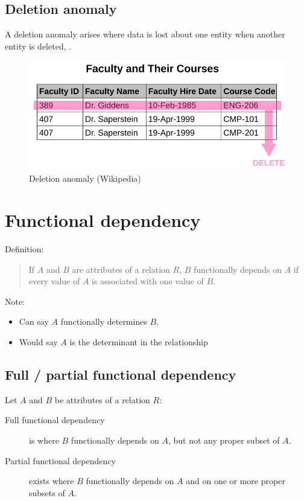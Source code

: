 \documentclass[slides]{pgnotes}
\begin{document}
\subsection{Deletion anomaly}\label{deletion}

A deletion anomaly arises where data is lost about one entity when
another entity is deleted, .

\begin{figure}[htbp]
\centering
\includegraphics[width=0.5\linewidth]{deletion_anomaly}
\caption{Deletion anomaly (Wikipedia){}}
\end{figure}

\newpage

\section{Functional dependency}\label{functional-dependency}

Definition:

\begin{quotation}
If \(A\) and \(B\) are attributes of a relation \(R\), \(B\)
functionally depends on \(A\) if every value of \(A\) is associated with
one value of \(B\).
\end{quotation}

Note: 

\begin{itemize}
\item
  Can say \(A\) functionally determines \(B\).
\item
  Would say \(A\) is the determinant in the relationship
\end{itemize}


\subsection{Full / partial functional dependency}
\label{full-partial-functional-dependency}

Let \(A\) and \(B\) be attributes of a relation \(R\):

\begin{description}
\item[Full functional dependency] is where \(B\) functionally depends on \(A\), but not any proper subset of \(A\).
\item[Partial functional dependency] exists where \(B\) functionally depends on \(A\) and on one or more proper subsets of \(A\).
\end{description}
\end{document}
